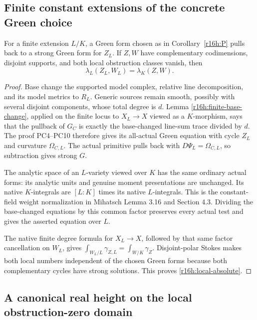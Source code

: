 \subsection{Finite constant extensions of the concrete Green choice}

\begin{proposition}
\label{r16h:constant-extension}
For a finite extension $L/K$, a Green form chosen as in
Corollary~\ref{r16h:P} pulls back to a strong Green form for $Z_L$.
If $Z,W$ have complementary codimensions, disjoint supports, and both
local obstruction classes vanish, then
\[
                   \lambda_L(Z_L,W_L)=\lambda_K(Z,W).
 \tag{H16.8}\label{r16h:local-absolute}
\]
\end{proposition}

\begin{proof}
Base change the supported model complex, relative line decomposition,
and its model metrics to $R_L$. Generic sources remain smooth, possibly
with several disjoint components, whose total degree is $d$. Lemma
\ref{r16h:finite-base-change}, applied on the finite locus to
$X_L\to X$ viewed as a $K$-morphism, says that the pullback of $G_C$
is exactly the base-changed line-sum trace divided by $d$. The proof
PC4--PC10 therefore gives its all-actual Green equation with cycle
$Z_L$ and curvature $\Omega_{C,L}$. The actual primitive pulls back
with $D\Psi_L=\Omega_{C,L}$, so subtraction gives strong $G$.

The analytic space of an $L$-variety viewed over $K$ has the same
ordinary actual forms: its analytic units and genuine moment
presentations are unchanged. Its native $K$-integrals are $[L:K]$
times its native $L$-integrals. This is the constant-field weight
normalization in Mihatsch Lemma 3.16 and Section 4.3. Dividing the
base-changed equations by this common factor preserves every actual
test and gives the asserted equation over $L$.

The native finite degree formula for $X_L\to X$, followed by that
same factor cancellation on $W_L$, gives
$\int_{W_L/L}\gamma_{Z,L}=\int_{W/K}\gamma_Z$. Disjoint-polar
Stokes makes both local numbers independent of the chosen Green
forms because both complementary cycles have strong solutions. This
proves \eqref{r16h:local-absolute}.
\end{proof}

\subsection{A canonical real height on the local obstruction-zero domain}

